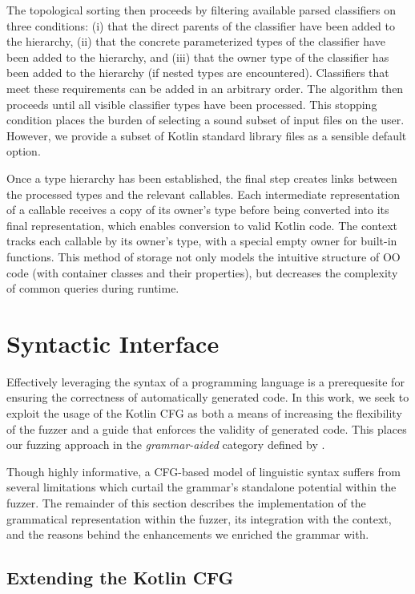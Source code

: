 The topological sorting then proceeds by filtering available parsed classifiers on three conditions: (i) that the direct parents of the classifier have been added to the hierarchy, (ii) that the concrete parameterized types of the classifier have been added to the hierarchy, and (iii) that the owner
type of the classifier has been added to the hierarchy (if nested types are encountered).
Classifiers that meet these requirements can be added in an arbitrary order.
The algorithm then proceeds until all visible classifier types have been processed.
This stopping condition places the burden of selecting a sound
subset of input files on the user.
However, we provide a subset of Kotlin standard library files as
a sensible default option.

Once a type hierarchy has been established, the final step creates links between the
processed types and the relevant callables.
Each intermediate representation of a callable receives a copy of its owner's type
before being converted into its final representation, which enables conversion to
valid Kotlin code.
The context tracks each callable by its owner's type, with a special empty owner for built-in 
functions.
This method of storage not only models the intuitive structure of \Gls{OO} code 
(with container classes and their properties), but decreases the complexity of
common queries during runtime.

\section{\label{sec:syntax}Syntactic Interface}

Effectively leveraging the syntax of a programming language is a prerequesite for
ensuring the correctness of automatically generated code.
In this work, we seek to exploit the usage of the Kotlin \gls{CFG} as both a means of increasing
the flexibility of the fuzzer and a guide that enforces the validity of generated code.
This places our fuzzing approach in the \textit{grammar-aided} category defined by 
\citet{chen2020survey}.

Though highly informative, a \gls{CFG}-based model of linguistic syntax
suffers from several limitations which
curtail the grammar's standalone potential within the fuzzer.
The remainder of this section describes the
implementation of the grammatical representation
within the fuzzer, its integration with the context,
and the reasons behind the enhancements
we enriched the grammar with.

\subsection{\label{subsec:extending-cfg} Extending the Kotlin CFG}

